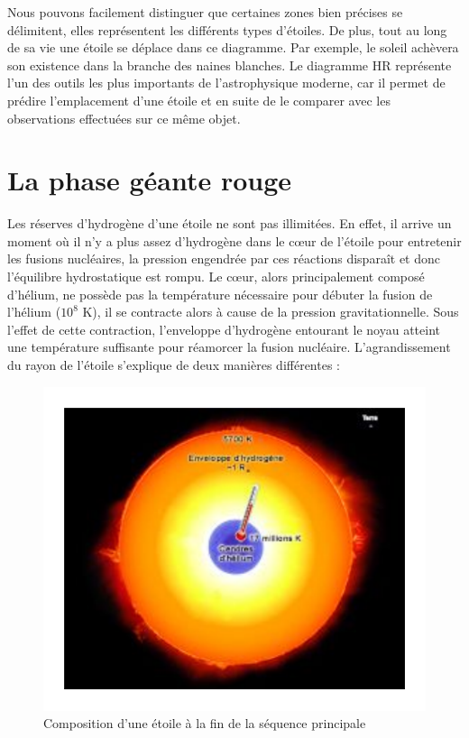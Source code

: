 Nous pouvons facilement distinguer que certaines zones bien précises se délimitent, elles représentent les différents types d’étoiles. De plus, tout au long de sa vie une étoile se déplace dans ce diagramme. Par exemple, le soleil achèvera son existence dans la branche des naines blanches. Le diagramme HR représente l’un des outils les plus importants de l’astrophysique moderne, car il permet de prédire l’emplacement d’une étoile et en suite de le comparer avec les observations effectuées sur ce même objet.\bigskip

\section{La phase géante rouge}\medskip

Les réserves d’hydrogène d’une étoile ne sont pas illimitées. En effet, il arrive un moment où il n’y a plus assez d’hydrogène dans le cœur de l’étoile pour entretenir les fusions nucléaires, la pression engendrée par ces réactions disparaît et donc l’équilibre hydrostatique est rompu. Le cœur, alors principalement composé d’hélium, ne possède pas la température nécessaire pour débuter la fusion de l’hélium ($10^{8}$ K), il se contracte alors à cause de la pression gravitationnelle. Sous l’effet de cette contraction, l’enveloppe d’hydrogène entourant le noyau atteint une température suffisante pour réamorcer la fusion nucléaire. L’agrandissement du rayon de l’étoile s’explique de deux manières   différentes :\bigskip

\begin{figure}[H]\vspace{1cm}
	\centering
	\includegraphics[scale=0.6]{images/compo-fin-sq}
	\caption{Composition d'une étoile à la fin de la séquence principale}
\end{figure}\bigskip                            

